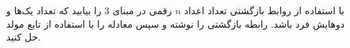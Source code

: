 \EXERCISE
با استفاده از روابط بازگشتی تعداد اعداد
$n$
رقمی در مبنای
$3$
را بیابید که تعداد یک‌ها و دوهایش فرد باشد. رابطه بازگشتی را نوشته و سپس معادله را با استفاده از تابع مولد حل کنید.